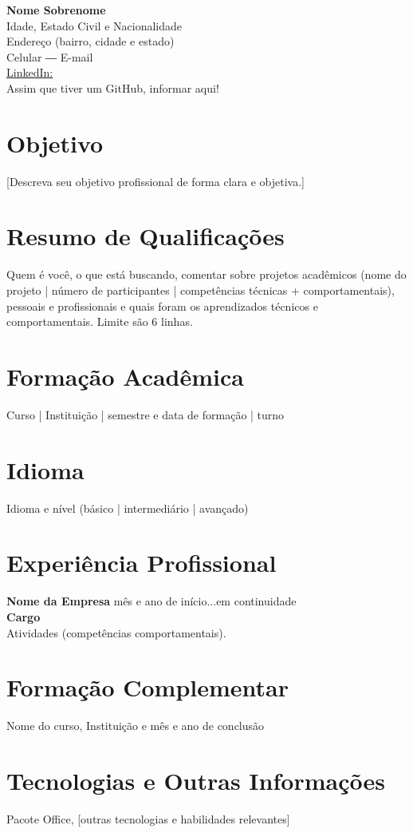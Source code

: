 \documentclass[a4paper,10pt]{article}
\begin{document}
\begin{center}
    \textbf{\Large Nome Sobrenome} \\
    Idade, Estado Civil e Nacionalidade \\
    Endereço (bairro, cidade e estado) \\
    Celular ― E-mail \\
    \href{https://www.linkedin.com/in/escreva-o-seu-linkedin/}{LinkedIn:} \\
    Assim que tiver um GitHub, informar aqui!
\end{center}

\section*{Objetivo}

[Descreva seu objetivo profissional de forma clara e objetiva.]

\section*{Resumo de Qualificações}

Quem é você, o que está buscando, comentar sobre projetos acadêmicos (nome do projeto | número de participantes | competências técnicas + comportamentais), pessoais e profissionais e quais foram os aprendizados técnicos e comportamentais. Limite são 6 linhas.

\section*{Formação Acadêmica}

Curso | Instituição | semestre e data de formação | turno

\section*{Idioma}

Idioma e nível (básico | intermediário | avançado)

\section*{Experiência Profissional}

\textbf{Nome da Empresa} \hfill mês e ano de início...em continuidade \\
\textbf{Cargo} \\
Atividades (competências comportamentais).

\section*{Formação Complementar}

Nome do curso, Instituição e mês e ano de conclusão

\section*{Tecnologias e Outras Informações}

Pacote Office, [outras tecnologias e habilidades relevantes]
\end{document}
